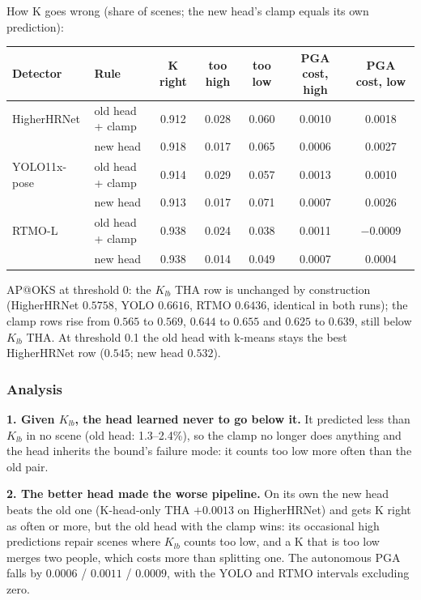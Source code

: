 \vspace{0.5em}

How K goes wrong (share of scenes; the new head's clamp equals its own prediction):

{\small
\begin{tabular}{llccccc}
\hline
\textbf{Detector} & \textbf{Rule} & \textbf{K right} & \textbf{too high} & \textbf{too low} & \textbf{PGA cost, high} & \textbf{PGA cost, low} \\
\hline
HigherHRNet  & old head + clamp & 0.912 & 0.028 & 0.060 & 0.0010 & 0.0018 \\
             & new head         & 0.918 & 0.017 & 0.065 & 0.0006 & 0.0027 \\
YOLO11x-pose & old head + clamp & 0.914 & 0.029 & 0.057 & 0.0013 & 0.0010 \\
             & new head         & 0.913 & 0.017 & 0.071 & 0.0007 & 0.0026 \\
RTMO-L       & old head + clamp & 0.938 & 0.024 & 0.038 & 0.0011 & $-0.0009$ \\
             & new head         & 0.938 & 0.014 & 0.049 & 0.0007 & 0.0004 \\
\hline
\end{tabular}
}

\vspace{0.5em}

AP@OKS at threshold 0: the $K_{lb}$ THA row is unchanged by construction (HigherHRNet $0.5758$, YOLO $0.6616$, RTMO $0.6436$, identical in both runs); the clamp rows rise from $0.565$ to $0.569$, $0.644$ to $0.655$ and $0.625$ to $0.639$, still below $K_{lb}$ THA. At threshold 0.1 the old head with k-means stays the best HigherHRNet row ($0.545$; new head $0.532$).

\subsubsection{Analysis}

\textbf{1. Given $K_{lb}$, the head learned never to go below it.} It predicted less than $K_{lb}$ in no scene (old head: 1.3--2.4\%), so the clamp no longer does anything and the head inherits the bound's failure mode: it counts too low more often than the old pair.

\textbf{2. The better head made the worse pipeline.} On its own the new head beats the old one (K-head-only THA $+0.0013$ on HigherHRNet) and gets K right as often or more, but the old head with the clamp wins: its occasional high predictions repair scenes where $K_{lb}$ counts too low, and a K that is too low merges two people, which costs more than splitting one. The autonomous PGA falls by $0.0006$ / $0.0011$ / $0.0009$, with the YOLO and RTMO intervals excluding zero.

